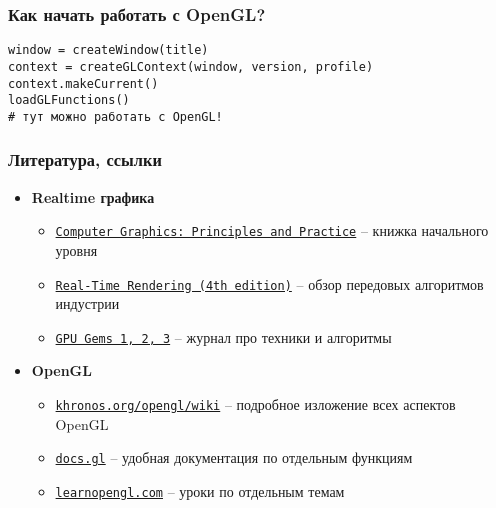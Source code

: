 \documentclass[10pt]{beamer}
\begin{document}
\begin{frame}[fragile]
\frametitle{Как начать работать с OpenGL?}
\begin{verbatim}
window = createWindow(title)
context = createGLContext(window, version, profile)
context.makeCurrent()
loadGLFunctions()
# тут можно работать с OpenGL!
\end{verbatim}
\end{frame}

\begin{frame}
\frametitle{Литература, ссылки}
\begin{itemize}
\item \textbf{Realtime графика}
\begin{itemize}
\item \href{https://cgpp.net/about.xml}{\texttt{Computer Graphics: Principles and Practice}} -- книжка начального уровня
\item \href{https://www.amazon.com/Real-Time-Rendering-Fourth-Tomas-Akenine-M\%C3\%B6ller/dp/1138627003}{\texttt{Real-Time Rendering (4th edition)}} -- обзор передовых алгоритмов индустрии
\item \href{https://developer.nvidia.com/gpugems}{\texttt{GPU Gems 1, 2, 3}} -- журнал про техники и алгоритмы
\end{itemize}
\item \textbf{OpenGL}
\begin{itemize}
\item \href{https://khronos.org/opengl/wiki}{\nolinkurl{khronos.org/opengl/wiki}} -- подробное изложение всех аспектов OpenGL
\item \href{http://docs.gl}{\nolinkurl{docs.gl}} -- удобная документация по отдельным функциям
\item \href{https://learnopengl.com}{\nolinkurl{learnopengl.com}} -- уроки по отдельным темам
\end{itemize}
\end{itemize}
\end{frame}
\end{document}
